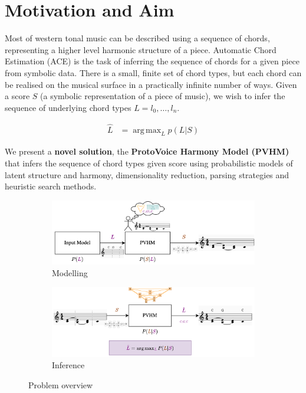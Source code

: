 \documentclass[12pt,a4paper,twoside,openright]{report}
\DeclareMathOperator*{\argmax}{arg\,max}
\theoremstyle{definition}
\begin{document}
\section{Motivation and Aim}
Most of western tonal music can be described using a sequence of chords, representing a higher level harmonic structure of a piece. Automatic Chord Estimation (ACE) is the task of inferring the sequence of chords for a given piece from symbolic data. There is a small, finite set of chord types, but each chord can be realised on the musical surface in a practically infinite number of ways. Given a score $S$ (a symbolic representation of a piece of music), we wish to infer the sequence of underlying chord types $L = l_0, \dots, l_n$. 

\begin{equation}
  \begin{align}
    \hat L &= \argmax_L p(L|S) 
  \end{align}
\end{equation} 

We present a \textbf{novel solution}, the \textbf{ProtoVoice Harmony Model (PVHM)} that infers the sequence of chord types given score using probabilistic models of latent structure and harmony, dimensionality reduction, parsing strategies and heuristic search methods.

\begin{figure}[h]
  \centering
  \begin{subfigure}[t]{\textwidth}
    \centering\includegraphics[keepaspectratio,width=\textwidth]{intro/overview/generation}
    \caption{Modelling}
    \label{fig:modellingOverview}
  \end{subfigure}
  \begin{subfigure}[t]{\textwidth}
    \centering\includegraphics[keepaspectratio,width=\textwidth]{intro/overview/inference}
    \caption{Inference}
    \label{fig:inferenceOverview}
  \end{subfigure}
  \caption{Problem overview}
  \label{fig:overview}
\end{figure}
\end{document}
